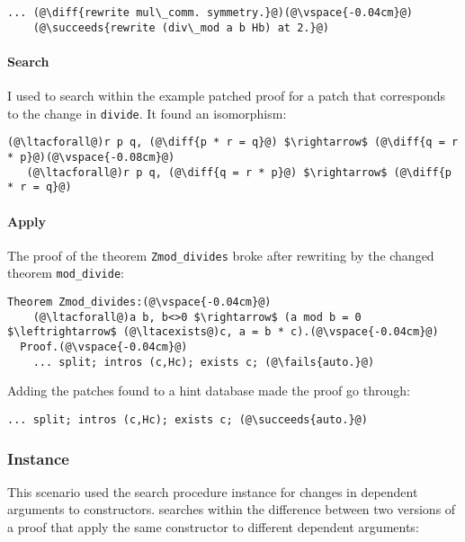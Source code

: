 \begin{lstlisting}[language=coq]
    ... (@\diff{rewrite mul\_comm. symmetry.}@)(@\vspace{-0.04cm}@)
    (@\succeeds{rewrite (div\_mod a b Hb) at 2.}@)
\end{lstlisting}

\paragraph{Search} I used \sysname to search within the example patched proof for a patch
that corresponds to the change in \lstinline{divide}.
It found an isomorphism:

\begin{lstlisting}[language=coq]
   (@\ltacforall@)r p q, (@\diff{p * r = q}@) $\rightarrow$ (@\diff{q = r * p}@)(@\vspace{-0.08cm}@)
   (@\ltacforall@)r p q, (@\diff{q = r * p}@) $\rightarrow$ (@\diff{p * r = q}@)
\end{lstlisting}

\paragraph{Apply} The proof of the theorem \lstinline{Zmod_divides} broke after rewriting by the changed theorem \lstinline{mod_divide}:

\begin{lstlisting}[language=coq]
  Theorem Zmod_divides:(@\vspace{-0.04cm}@)
    (@\ltacforall@)a b, b<>0 $\rightarrow$ (a mod b = 0 $\leftrightarrow$ (@\ltacexists@)c, a = b * c).(@\vspace{-0.04cm}@)
  Proof.(@\vspace{-0.04cm}@)
    ... split; intros (c,Hc); exists c; (@\fails{auto.}@)
\end{lstlisting}
Adding the patches \sysname found to a hint database made the proof go through:

\begin{lstlisting}[language=coq]
    ... split; intros (c,Hc); exists c; (@\succeeds{auto.}@)
\end{lstlisting}

\subsubsection{Instance}

This scenario used the search procedure instance for changes in dependent arguments to constructors.
\sysname searches within the difference between two versions of a proof that apply the same constructor
to different dependent arguments:

